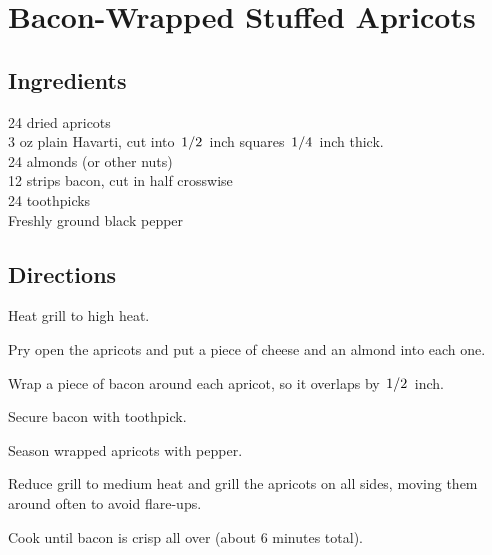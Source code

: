 \documentclass{article}
\newcounter{qcounter}
\begin{document}
\newcommand{\slfrac}[2]{\left.#1\middle/#2\right.}
\newcommand{\degree}{\ensuremath{^\circ}}

\section*{Bacon-Wrapped Stuffed Apricots}



\subsection*{Ingredients}
24 dried apricots\\
3 oz plain Havarti, cut into $\slfrac{1}{2}$ inch squares $\slfrac{1}{4}$ inch thick.\\
24 almonds (or other nuts)\\
12 strips bacon, cut in half crosswise\\
24 toothpicks\\
Freshly ground black pepper\\

\subsection*{Directions}
\begin{list}{:~}{}
\item Heat grill to high heat.
\item Pry open the apricots and put a piece of cheese and an almond into each one.
\item Wrap a piece of bacon around each apricot, so it overlaps by $\slfrac{1}{2}$ inch.
\item Secure bacon with toothpick.
\item Season wrapped apricots with pepper.
\item Reduce grill to medium heat and grill the apricots on all sides, moving them around often to avoid flare-ups.
\item Cook until bacon is crisp all over (about 6 minutes total).
\end{list}
\end{document}
